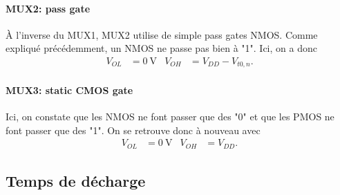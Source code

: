 \documentclass[frenchb,DIV=14]{scrartcl}
\begin{document}
\paragraph{MUX2: pass gate} 
\`{A} l'inverse du MUX1, MUX2 utilise de simple pass gates NMOS.
Comme expliqué précédemment, un NMOS ne passe pas bien à "1". Ici, on a donc
\begin{align*}
	V_{OL} &= \SI{0}{\volt} & V_{OH} &= V_{DD}-V_{t0,n}.
\end{align*}

\paragraph{MUX3: static CMOS gate}
Ici, on constate que les NMOS ne font passer que des "0" et que les PMOS ne
font passer que des "1". On se retrouve donc à nouveau avec
\begin{align*}
	V_{OL} &= \SI{0}{\volt} & V_{OH} &= V_{DD}.
\end{align*}

\subsection*{Temps de décharge}
\end{document}
